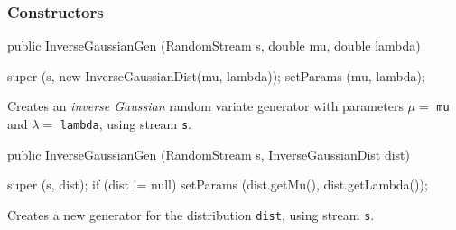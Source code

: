 \subsubsection* {Constructors}
\begin{code}

   public InverseGaussianGen (RandomStream s, double mu, double lambda) \begin{hide} {
      super (s, new InverseGaussianDist(mu, lambda));
      setParams (mu, lambda);
   }\end{hide}
\end{code} 
\begin{tabb}  Creates an {\em inverse Gaussian\/} random variate generator
 with parameters $\mu = $ \texttt{mu} and $\lambda= $ \texttt{lambda},
  using stream \texttt{s}. 
\end{tabb}
\begin{code}

   public InverseGaussianGen (RandomStream s, InverseGaussianDist dist) \begin{hide} {
      super (s, dist);
      if (dist != null)
         setParams (dist.getMu(), dist.getLambda());
   }\end{hide}
\end{code}
  \begin{tabb} Creates a new generator for the distribution \texttt{dist},
     using stream \texttt{s}.
  \end{tabb}

